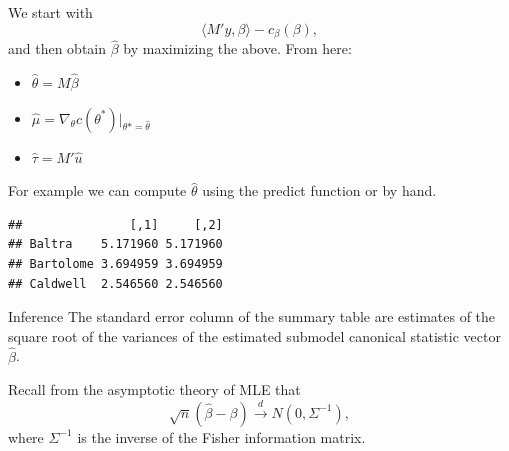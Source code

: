 \documentclass[
  ignorenonframetext,
]{beamer}
\newenvironment{Shaded}{\begin{snugshade}}{\end{snugshade}}
\newcommand{\AttributeTok}[1]{\textcolor[rgb]{0.77,0.63,0.00}{#1}}
\newcommand{\DecValTok}[1]{\textcolor[rgb]{0.00,0.00,0.81}{#1}}
\newcommand{\FunctionTok}[1]{\textcolor[rgb]{0.00,0.00,0.00}{#1}}
\newcommand{\NormalTok}[1]{#1}
\newcommand{\OtherTok}[1]{\textcolor[rgb]{0.56,0.35,0.01}{#1}}
\newcommand{\SpecialCharTok}[1]{\textcolor[rgb]{0.00,0.00,0.00}{#1}}
\newcommand{\StringTok}[1]{\textcolor[rgb]{0.31,0.60,0.02}{#1}}
\providecommand{\tightlist}{%
  \setlength{\itemsep}{0pt}\setlength{\parskip}{0pt}}
\begin{document}
\begin{frame}[fragile]{}
\protect\hypertarget{section-9}{}
We start with \[
  \langle M'y, \beta \rangle - c_\beta(\beta),
\] and then obtain \(\hat{\beta}\) by maximizing the above. From here:

\begin{itemize}
\tightlist
\item
  \(\hat{\theta} = M\hat{\beta}\)
\item
  \(\hat\mu = \nabla_\theta c(\theta^*)|_{\theta* = \hat{\theta}}\)
\item
  \(\hat\tau = M'\hat{u}\)
\end{itemize}

\vspace{12pt}

For example we can compute \(\hat\theta\) using the predict function or
by hand. \vspace{12pt} \tiny

\begin{Shaded}
\end{Shaded}

\begin{verbatim}
##               [,1]     [,2]
## Baltra    5.171960 5.171960
## Bartolome 3.694959 3.694959
## Caldwell  2.546560 2.546560
\end{verbatim}
\end{frame}

\begin{frame}{Inference}
\protect\hypertarget{inference}{}
The standard error column of the summary table are estimates of the
square root of the variances of the estimated submodel canonical
statistic vector \(\hat\beta\).

\vspace{12pt}

Recall from the asymptotic theory of MLE that \[
  \sqrt{n}(\hat\beta - \beta) \overset{d}{\to} N(0, \Sigma^{-1}),
\] where \(\Sigma^{-1}\) is the inverse of the Fisher information
matrix.
\end{frame}
\end{document}

